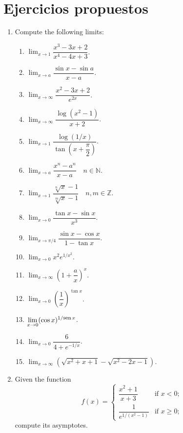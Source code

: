 \section{Ejercicios propuestos}
\begin{enumerate}[leftmargin=*]
\item Compute the following limits:
      \begin{multicols}{2}
      \begin{enumerate}
      \item $\displaystyle \lim_{x\rightarrow 1}\dfrac{x^3-3x+2}{x^4-4x+3}$.
      \item $\displaystyle \lim_{x\rightarrow a}\dfrac{\sin x-\sin a}{x-a}$.
      \item $\displaystyle \lim_{x\rightarrow\infty}\dfrac{x^2-3x+2}{e^{2x}}$.
      \item $\displaystyle \lim_{x\rightarrow\infty}\dfrac{\log(x^2-1)}{x+2}$.
      \item $\displaystyle \lim_{x\rightarrow 1}\dfrac{\log(1/x)}{\tan(x+\dfrac{\pi}{2})}$.
      \item $\displaystyle \lim_{x\rightarrow a}\dfrac{x^n-a^n}{x-a}\quad n\in \mathbb{N}$.
      \item $\displaystyle \lim_{x\rightarrow 1}\dfrac{\sqrt[n]{x}-1}{\sqrt[m]{x}-1}\quad n,m \in \mathbb{Z}$.
      \item $\displaystyle \lim_{x\rightarrow 0}\dfrac{\tan x-\sin x}{x^3}$.
      \item $\displaystyle \lim_{x\rightarrow \pi/4}\dfrac{\sin x-\cos x}{1-\tan x}$.
      \item $\displaystyle \lim_{x\rightarrow 0}x^2e^{1/x^2}$.
      \item $\displaystyle \lim_{x\rightarrow \infty}\left(1+\dfrac{a}{x}\right)^x$.
      \item $\displaystyle \lim_{x\rightarrow 0}\left(\dfrac{1}{x}\right)^{\tan x}$.
      \item $\displaystyle \lim_{x\rightarrow 0}(\cos x)^{1/\mbox{\footnotesize sen}\, x}$.
      \item $\displaystyle \lim_{x\rightarrow 0}\dfrac{6}{4+e^{-1/x}}$.
      \item $\displaystyle \lim_{x\rightarrow \infty}\left(\sqrt{x^2+x+1}-\sqrt{x^2-2x-1}\right)$.
      \end{enumerate}
      \end{multicols}

\item Given the function
      \[
      f(x) =
      \begin{cases}
      \dfrac{x^2+1}{x+3}       & \mbox{if $x<0$};     \\
      \dfrac{1}{e^{1/(x^2-1)}} & \mbox{if $x\geq 0$;}
      \end{cases}
      \]
      compute its asymptotes.


\end{enumerate}
